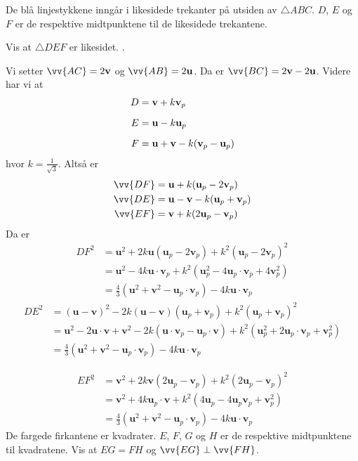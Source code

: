 \documentclass[english,oneside, hidelinks, 11 pt, class=report,crop=false]{standalone}
\begin{document}
\newpage
{}
De blå linjestykkene inngår i likesidede trekanter på utsiden av $\triangle ABC$. $D$, $E$ og $F$ er de respektive midtpunktene til de likesidede trekantene. \os

Vis at $\triangle DEF$ er likesidet.
.

\sv
Vi setter $\vv{AC}=2\textbf{v}$ og $\vv{AB}=2\textbf{u}$. Da er $\vv{BC}=2\textbf{v}-2\textbf{u}$. Videre har vi at
\begin{align*}
	D&=\textbf{v}+k\textbf{v}_p \vn
	E&=\textbf{u}-k\textbf{u}_p \vn
	F&=\textbf{u}+\textbf{v}-k(\textbf{v}_p-\textbf{u}_p)
\end{align*} 
hvor $k=\frac{1}{\sqrt{3}}$. Altså er
\begin{align*}
	\vv{DF}&=\textbf{u}+k(\textbf{u}_p-2\textbf{v}_p) \\
	\vv{DE}&=\textbf{u}-\textbf{v}-k(\textbf{u}_p+\textbf{v}_p) \\
	\vv{EF}&=\textbf{v}+k(2\textbf{u}_p-\textbf{v}_p)
\end{align*} 
Da er
\begin{align*}
DF^2&=\textbf{u}^2+2k\textbf{u}(\textbf{u}_p-2\textbf{v}_p)+k^2(\textbf{u}_p-2\textbf{v}_p)^2\\
&=\textbf{u}^2-4k\textbf{u}\cdot\textbf{v}_p+k^2(\textbf{u}_p^2-4\textbf{u}_p\cdot\textbf{v}_p+4\textbf{v}_p^2) \\
&=\frac{4}{3}(\textbf{u}^2+\textbf{v}^2-\textbf{u}_p\cdot\textbf{v}_p)-4k\textbf{u}\cdot\textbf{v}_p
\end{align*}
\begin{align*}	DE^2&=(\textbf{u}-\textbf{v})^2-2k(\textbf{u}-\textbf{v})(\textbf{u}_p+\textbf{v}_p)+k^2(\textbf{u}_p+\textbf{v}_p)^2 \\
&=\textbf{u}^2-2\textbf{u}\cdot\textbf{v}+\textbf{v}^2-2k(\textbf{u}\cdot\textbf{v}_p-\textbf{u}_p\cdot\textbf{v})+k^2(\textbf{u}_p^2+2\textbf{u}_p\cdot\textbf{v}_p+\textbf{v}_p^2)\\
&=\frac{4}{3}(\textbf{u}^2+\textbf{v}^2-\textbf{u}_p\cdot\textbf{v}_p)-4k\textbf{u}\cdot\textbf{v}_p
\end{align*}

\begin{align*}
	EF^2 &= \textbf{v}^2+2k\textbf{v}(2\textbf{u}_p-\textbf{v}_p)+k^2(2\textbf{u}_p-\textbf{v}_p)^2 \\
	&=\textbf{v}^2+4k\textbf{u}_p\cdot\textbf{v}+k^2(4\textbf{u}_p-4\textbf{u}_p\textbf{v}_p+\textbf{v}_p^2) \\
	&=\frac{4}{3}(\textbf{u}^2+\textbf{v}^2-\textbf{u}_p\cdot\textbf{v}_p)-4k\textbf{u}\cdot\textbf{v}_p
\end{align*}
\newpage
{}
De fargede firkantene er kvadrater. $E$, $F$, $G$ og $H$ er de respektive midtpunktene til kvadratene. Vis at $EG=FH$ og $\vv{EG}\perp\vv{FH}$.
\end{document}
